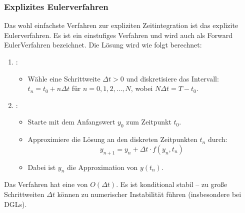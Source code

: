 \documentclass[letterpaper,10pt,german]{jupyterBook}
\begin{document}
\subsubsection{Explizites Eulerverfahren}
\label{\detokenize{chapters/chapter6/TransienteDynamik:explizites-eulerverfahren}}
\sphinxAtStartPar
Das wohl einfachste Verfahren zur expliziten Zeitintegration ist das explizite Eulerverfahren. Es ist ein einstufiges Verfahren und wird auch als Forward Euler\sphinxhyphen{}Verfahren bezeichnet. Die Lösung wird wie folgt berechnet:
\begin{enumerate}
%
\item {} 
\sphinxAtStartPar
{}:
\begin{itemize}
\item {} 
\sphinxAtStartPar
Wähle eine Schrittweite \( \Delta t > 0 \) und diskretisiere das Intervall:
\( t_n = t_0 + n \Delta t \) für \( n = 0, 1, 2, \dots, N \), wobei \( N \Delta t = T - t_0 \).

\end{itemize}

\item {} 
\sphinxAtStartPar
{}:
\begin{itemize}
\item {} 
\sphinxAtStartPar
Starte mit dem Anfangswert \( y_0 \) zum Zeitpunkt \( t_0 \).

\item {} 
\sphinxAtStartPar
Approximiere die Lösung an den diskreten Zeitpunkten \( t_n \) durch:
\begin{equation*}
y_{n+1} = y_n + \Delta t \cdot f(y_n, t_n)
\end{equation*}
\item {} 
\sphinxAtStartPar
Dabei ist \( y_n \) die Approximation von \( y(t_n) \).

\end{itemize}

\end{enumerate}

\sphinxAtStartPar
Das Verfahren hat eine  von \( O(\Delta t) \). Es
ist konditional stabil – zu große Schrittweiten \( \Delta t \) können zu numerischer Instabilität führen (insbesondere bei  DGLs).
\end{document}
